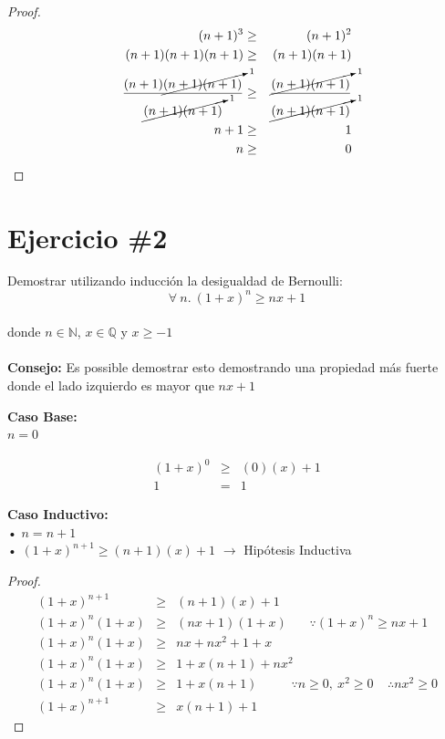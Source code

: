\documentclass[11pt,letterpaper]{article}
\begin{document}
\begin{proof}

\begin{eqnarray*}
(n+1)^3&\geq&(n+1)^2\\
(n+1)(n+1)(n+1)&\geq&(n+1)(n+1)\\
\frac{(n+1)\cancelto{1}{(n+1)(n+1)}}{\cancelto{1}{(n+1)(n+1)}}&\geq&\frac{\cancelto{1}{(n+1)(n+1)}}{\cancelto{1}{(n+1)(n+1)}} \\
n+1&\geq& 1\\
n&\geq& 0
\end{eqnarray*}

\end{proof}


\section*{\Large Ejercicio \#2}
\noindent Demostrar utilizando inducción la desigualdad de Bernoulli:
\[
        \forall\ n.\ (1+x)^n\geq nx+1
\]
\\donde $n\in \mathbb{N}$, $x\in \mathbb{Q}$ y $x\geq -1$
\\
\\{\bf Consejo: }Es possible demostrar esto demostrando una propiedad más fuerte
donde el lado izquierdo es mayor que $nx + 1$ \vspace{1cm}

\noindent \textbf{\large Caso Base:}\\
\noindent $n=0$

\begin{eqnarray*}
(1+x)^0 &\geq& (0)(x)+1 \\
1 &=& 1
\end{eqnarray*}

\vspace{0.1cm}

\noindent \textbf{\large Caso Inductivo:}\\
\noindent • $n=n+1$ \\
\noindent • $(1+x)^{n+1}\geq (n+1)(x)+1$ $\rightarrow$ Hipótesis Inductiva \\

\begin{proof}

\begin{eqnarray*}
(1+x)^{n+1}&\geq&(n+1)(x)+1 \\
(1+x)^n(1+x)&\geq&(nx+1)(1+x) \ \ \ \ \ \ \ \ \because(1+x)^n \geq nx+1 \\ 
(1+x)^n(1+x)&\geq& nx+nx^2+1+x \\
(1+x)^n(1+x)&\geq& 1+x(n+1)+nx^2 \\
(1+x)^n(1+x)&\geq& 1+x(n+1) \ \ \ \ \ \ \ \ \ \ \ \ \because n \geq 0, \ x^2 \geq 0 \ \ \ \ \ \therefore nx^2 \geq 0 \\
(1+x)^{n+1}&\geq& x(n+1)+1
\end{eqnarray*}

\end{proof}
\end{document}
